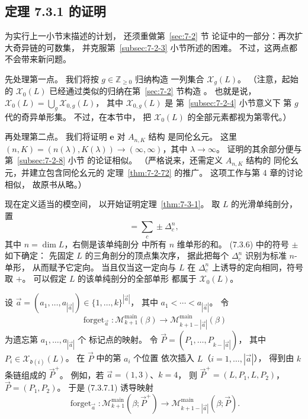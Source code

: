 
\subsection{定理 7.3.1 的证明}
\label{subsec:7-3-2}
为实行上一小节末描述的计划，
还须重做第~\ref{sec:7-2} 节
论证中的一部分：再次扩大奇异链的可数集，
并克服第~\ref{subsec:7-2-3} 小节所述的困难。
不过，这两点都不会带来新问题。

先处理第一点。
我们将按 $g\in\mathbb Z_{\ge0}$ 归纳构造
一列集合 $\mathcal X_g(L)$。
（注意，起始的 $\mathcal X_0(L)$
已经通过类似的归纳在第~\ref{sec:7-2} 节构造
。
也就是说，
$\mathcal X_0(L)=\bigcup_g\mathcal X_{0,g}(L)$，
其中 $\mathcal X_{0,g}(L)$ 是
第~\ref{subsec:7-2-4} 小节意义下
第 $g$ 代的奇异单形集。
不过，在本节中，
把 $\mathcal X_0(L)$ 的全部元素都视为第零代。）

再处理第二点。
我们将证明 $\mathbf e$ 对 $A_{n,K}$ 结构
是同伦幺元。
这里
$(n,K)=(n(\lambda),K(\lambda))
\to(\infty,\infty)$，其中 $\lambda\to\infty$。
证明的其余部分便与第~\ref{subsec:7-2-8} 小节
的论证相似。
（严格说来，还需定义 $A_{n,K}$ 结构的
同伦幺元，并建立包含同伦幺元的
定理~\ref{thm:7-2-72} 的推广。
这项工作与第 4 章的讨论相似，
故原书从略。）

现在定义适当的模空间，
以开始证明定理~\ref{thm:7-3-1}。
取 $L$ 的光滑单纯剖分，置
\begin{equation}
[L]=\sum_c\pm\Delta_c^n,
\tag{7.3.6}\label{eq:7-3-6}
\end{equation}
其中 $n=\dim L$，右侧是该单纯剖分
中所有 $n$ 维单形的和。
(7.3.6) 中的符号 $\pm$ 如下确定：
先固定 $L$ 的三角剖分的顶点集次序，
据此把每个 $\Delta_c^n$ 识别为标准 $n$-单形，
从而赋予它定向。
当且仅当这一定向与 $L$ 在 $\Delta_c^n$
上诱导的定向相同，符号取 $+$。
可以假定 $L$ 的该单纯剖分的全部单形
都属于 $\mathcal X_0(L)$。

设
$\vec a=(a_1,\ldots,a_{|\vec a|})
\in\{1,\ldots,k\}^{|\vec a|}$，
其中 $a_1<\cdots<a_{|\vec a|}$。
令
\begin{equation}
\operatorname{forget}_{\vec a}\colon
\mathcal M^{\mathrm{main}}_{k+1}(\beta)
\longrightarrow
\mathcal M^{\mathrm{main}}_{k+1-|\vec a|}(\beta)
\tag{7.3.7.1}\label{eq:7-3-7-1}
\end{equation}
为遗忘第 $a_1,\ldots,a_{|\vec a|}$ 个
标记点的映射。
令
$\vec P=(P_1,\ldots,P_{k-|\vec a|})$，
其中 $P_i\in\mathcal X_{\mathfrak d(i)}(L)$。
在 $\vec P$ 中的第 $a_i$ 个位置
依次插入 $L$（$i=1,\ldots,|\vec a|$），
得到由 $k$ 条链组成的 $\vec P^+$。
例如，若 $\vec a=(1,3)$、$k=4$，
则 $\vec P^+=(L,P_1,L,P_2)$，
$\vec P=(P_1,P_2)$。
于是 (7.3.7.1) 诱导映射
\begin{equation}
\operatorname{forget}_{\vec a}\colon
\mathcal M^{\mathrm{main}}_{k+1}(\beta;\vec P^+)
\longrightarrow
\mathcal M^{\mathrm{main}}_{k+1-|\vec a|}(\beta;\vec P).
\tag{7.3.7.2}\label{eq:7-3-7-2}
\end{equation}

